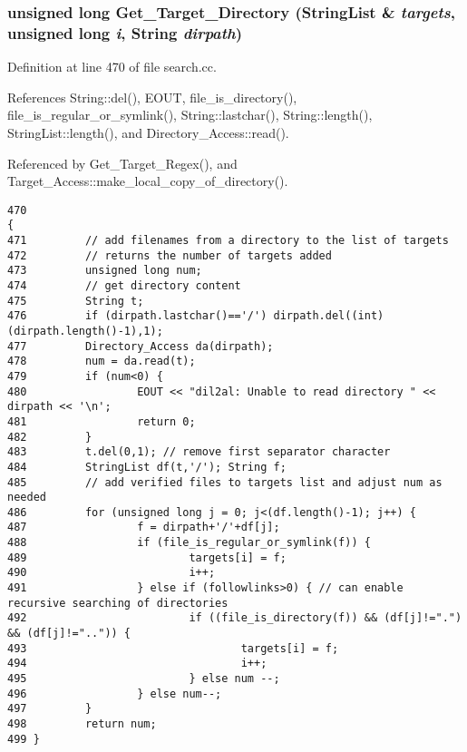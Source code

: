 \subsubsection{\setlength{\rightskip}{0pt plus 5cm}unsigned long Get\_\-Target\_\-Directory ({\bf String\-List} \& {\em targets}, unsigned long {\em i}, {\bf String} {\em dirpath})}\label{dil2al_8hh_a363}




Definition at line 470 of file search.cc.

References String::del(), EOUT, file\_\-is\_\-directory(), file\_\-is\_\-regular\_\-or\_\-symlink(), String::lastchar(), String::length(), String\-List::length(), and Directory\_\-Access::read().

Referenced by Get\_\-Target\_\-Regex(), and Target\_\-Access::make\_\-local\_\-copy\_\-of\_\-directory().



\footnotesize\begin{verbatim}470                                                                                           {
471         // add filenames from a directory to the list of targets
472         // returns the number of targets added
473         unsigned long num;
474         // get directory content
475         String t;
476         if (dirpath.lastchar()=='/') dirpath.del((int) (dirpath.length()-1),1);
477         Directory_Access da(dirpath);
478         num = da.read(t);
479         if (num<0) {
480                 EOUT << "dil2al: Unable to read directory " << dirpath << '\n';
481                 return 0;
482         }
483         t.del(0,1); // remove first separator character
484         StringList df(t,'/'); String f;
485         // add verified files to targets list and adjust num as needed
486         for (unsigned long j = 0; j<(df.length()-1); j++) {
487                 f = dirpath+'/'+df[j];
488                 if (file_is_regular_or_symlink(f)) {
489                         targets[i] = f;
490                         i++;
491                 } else if (followlinks>0) { // can enable recursive searching of directories
492                         if ((file_is_directory(f)) && (df[j]!=".") && (df[j]!="..")) {
493                                 targets[i] = f;
494                                 i++;
495                         } else num --;
496                 } else num--;
497         }
498         return num;
499 }
\end{verbatim}\normalsize 
{}
